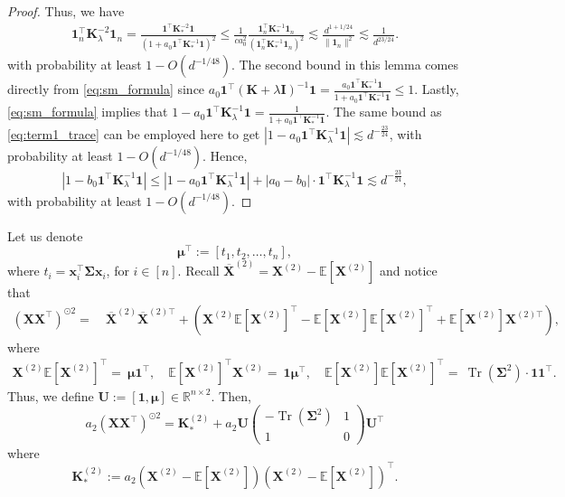 \documentclass[twoside,11pt]{article}
\newcommand{\R}{\mathbb{R}}
\newcommand{\E}{\mathbb{E}}
\def\bI{{\mathbf I}}
\newcommand{\ones}{\mathbf{1}}
\def\bK{{\boldsymbol K}}
\def\bU{{\boldsymbol U}}
\def\bX{{\boldsymbol X}}
\def\bx{{\boldsymbol x}}
\def\bSigma{{\boldsymbol \Sigma}}
\renewcommand{\bK}{\boldsymbol{K}}
\newcommand{\Tr}{\operatorname{Tr}}
\newcommand{\vmu}{\mbi{\mu}}
\newcommand{\1}{\mathbf{1}}
\def\mbi#1{\boldsymbol{#1}}
\def\mbi#1{\boldsymbol{#1}} %
\newcommand{\lbX}{\overline{\bX}^{(2)}}
\newcommand{\lbXt}{\overline{\bX}^{(2)\top}}
\begin{document}
\begin{proof}
Thus, we have
\begin{align}
    \mathbf{1}_n^\top\bK_{\lambda}^{-2}\mathbf{1}_n = \frac{ \1^\top\bK_*^{-2}\1 }{(1+a_0\1^\top\bK_*^{-1}\1)^2}\le \frac{1}{ca_0^2}\frac{\mathbf{1}_n^\top\bK_{*}^{-1}\mathbf{1}_n}{(\mathbf{1}_n^\top\bK_{*}^{-1}\mathbf{1}_n)^2}\lesssim \frac{ d^{1+1/24}}{  \|\mathbf{1}_n\|^2}\lesssim \frac{1}{d^{23/24}}.\label{eq:term1_trace}
\end{align}with probability at least $1-O(d^{-1/48})$. The second bound in this lemma comes directly from \eqref{eq:sm_formula} since 
$a_0\1^\top(\bK+\lambda\bI)^{-1}\ones=\frac{a_0\1^\top\bK_*^{-1}\1}{1+a_0\1^\top\bK_*^{-1}\1}\le 1$.
Lastly, \eqref{eq:sm_formula} implies that 
$1-a_0\1^\top\bK_{\lambda}^{- 1}\1 = \frac{1}{1+a_0\1^\top\bK_*^{-1}\1}$.
The same bound as \eqref{eq:term1_trace} can be employed here to get
$|1-a_0\1^\top\bK_{\lambda}^{- 1}\1|\lesssim d^{-\frac{23}{24}}$,
with probability at least $1-O(d^{-1/48})$. Hence,
\[|1-b_0\1^\top\bK_{\lambda}^{- 1}\1|\le |1-a_0\1^\top\bK_{\lambda}^{- 1}\1|+|a_0-b_0|\cdot\1^\top\bK_{\lambda}^{-1}\1\lesssim d^{-\frac{23}{24}},\]with probability at least $1-O(d^{-1/48})$.
\end{proof}





Let us denote  
\begin{equation}\label{eq:vmu}
    \vmu^\top := [t_1,t_2,\ldots,t_n],
\end{equation}
where $t_i=\bx_i^\top\bSigma\bx_i$, for $i\in [n]$. Recall $\overline{\bX}^{(2)}=\bX^{(2)}-\E[\bX^{(2)}]$ and notice that
\begin{align}
       (\bX\bX^\top)^{\odot 2}
       =~&  \lbX  \lbXt  + \left(\bX^{(2)}\E[\bX^{(2)}]^\top-\E[\bX^{(2)}]\E[\bX^{(2)}]^\top+\E[\bX^{(2)}]\bX^{(2)\top}\right),
\end{align} 
where 
\begin{align}
     \bX^{(2)}\E[\bX^{(2)}]^\top=~\vmu\1^\top, \quad 
     \E[\bX^{(2)}]^\top\bX^{(2)}=~\1\vmu^\top, \quad 
\E[\bX^{(2)}]\E[\bX^{(2)}]^\top=~\Tr(\bSigma^2)\cdot\1\1^\top.
\end{align}
Thus, we define $\bU:=[\1,\vmu]\in\R^{n\times 2}$. Then, 
\begin{equation}\label{eq:decomp:X^2}
    a_2(\bX\bX^\top)^{\odot 2} = \bK_*^{(2)}+a_2\bU  \begin{pmatrix}
        -\Tr(\bSigma^2) &1\\
        1& 0
    \end{pmatrix}\bU^\top
\end{equation}
where
\begin{equation}\label{eq:K_*(2)}
    \bK_*^{(2)}:=a_2(\bX^{(2)}-\E[\bX^{(2)}])(\bX^{(2)}-\E[\bX^{(2)}])^\top.
\end{equation}
\end{document}
